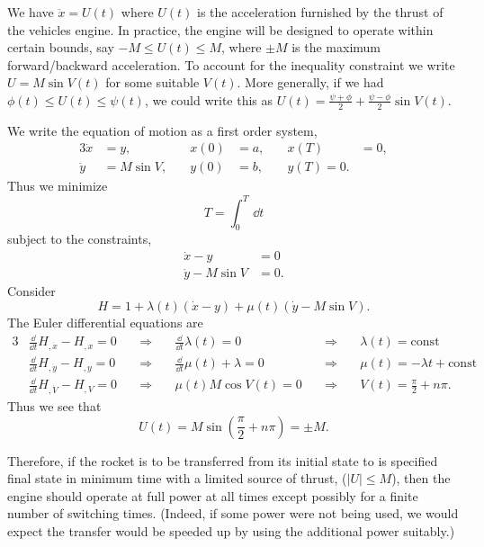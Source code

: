 \begin{Solution}
  We have $\ddot{x} = U(t)$ where $U(t)$ is the acceleration furnished by
  the thrust of the vehicles engine.  In practice, the engine will be designed
  to operate within certain bounds, say $-M \leq U(t) \leq M$, where
  $\pm M$ is the maximum forward/backward acceleration.  To account for the
  inequality constraint we write $U = M \sin V(t)$ for some suitable $V(t)$.
  More generally, if we had $\phi(t) \leq U(t) \leq \psi(t)$, we could write
  this as $U(t) = \frac{\psi + \phi}{2} + \frac{\psi - \phi}{2} \sin V(t)$.

  We write the equation of motion as a first order system,
  \begin{alignat*}{3}
    \dot{x} &= y, &\quad x(0) &= a, &\quad x(T) &= 0, \\
    \dot{y} &= M \sin V, &\quad y(0) &= b, &\quad y(T) = 0.
  \end{alignat*}
  Thus we minimize
  \[
  T = \int_0^T \,\dd t
  \]
  subject to the constraints,
  \begin{align*}
    \dot{x} - y &= 0 \\
    \dot{y} - M \sin V &= 0.
  \end{align*}
  Consider
  \[
  H = 1 + \lambda(t) (\dot{x} - y) + \mu(t) (\dot{y} - M \sin V).
  \]
  The Euler differential equations are
  \begin{alignat*}{3}
    &\frac{\dd}{\dd t} H_{,\dot{x}} - H_{,x} = 0 &\quad \Rightarrow \quad
    &\frac{\dd}{\dd t} \lambda(t) = 0 &\quad \Rightarrow \quad
    &\lambda(t) = \mathrm{const} \\
    &\frac{\dd}{\dd t} H_{,\dot{y}} - H_{,y} = 0 &\quad \Rightarrow \quad
    &\frac{\dd}{\dd t} \mu(t) + \lambda = 0 &\quad \Rightarrow \quad
    &\mu(t) = - \lambda t + \mathrm{const} \\
    &\frac{\dd}{\dd t} H_{,\dot{V}} - H_{,V} = 0 &\quad \Rightarrow \quad
    &\mu(t) M \cos V(t) = 0 &\quad \Rightarrow \quad
    &V(t) = \frac{\pi}{2} + n \pi.
  \end{alignat*}
  Thus we see that 
  \[
  U(t) = M \sin \left( \frac{\pi}{2} + n \pi \right) = \pm M.
  \]

  Therefore, if the rocket is to be transferred from its initial state to is
  specified final state in minimum time with a limited source of thrust, 
  ($|U| \leq M$), then the engine should operate at full power at all times
  except possibly for a finite number of switching times.  (Indeed, if some
  power were not being used, we would expect the transfer would be speeded 
  up by using the additional power suitably.)


\end{Solution}
